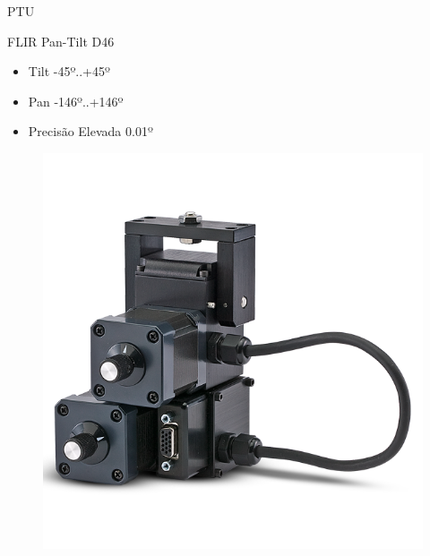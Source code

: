 \begin{frame}{PTU}
    
    \begin{minipage}{0.6\textwidth}
        
        FLIR Pan-Tilt D46

        \begin{itemize}
            \item Tilt -45º..+45º
            \item Pan -146º..+146º
            \item Precisão Elevada 0.01º
        \end{itemize}

    \end{minipage}%
    \begin{minipage}{0.4\textwidth}
        \begin{figure}
            \centering
            \includegraphics[width=1\textwidth]{img/ptu-d46.png}
        \end{figure}
    \end{minipage}

\end{frame}